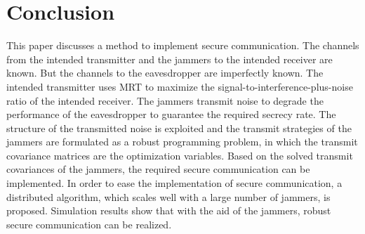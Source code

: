 \documentclass[conference]{IEEEtran}
\begin{document}




\section{Conclusion} \label{sec:conclusion}
This paper discusses a method to implement secure communication. The channels from the intended transmitter and the jammers to the intended receiver are known. But the channels to the eavesdropper are imperfectly known. The intended transmitter uses MRT to maximize the signal-to-interference-plus-noise ratio of the intended receiver. The jammers transmit noise to degrade the performance of the eavesdropper to guarantee the required secrecy rate. The structure of the transmitted noise is exploited and the transmit strategies of the jammers are formulated as a robust programming problem, in which the transmit covariance matrices are the optimization variables. Based on the solved transmit covariances of the jammers, the required secure communication can be implemented. In order to ease the implementation of secure communication, a distributed algorithm, which scales well with a large number of jammers, is proposed. Simulation results show that with the aid of the jammers, robust secure communication can be realized.













\end{document}

